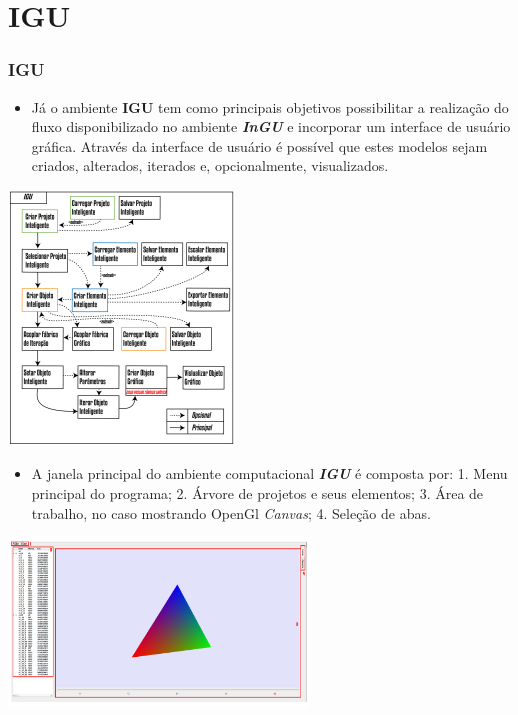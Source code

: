 \documentclass[10pt,aspectratio=169]{beamer}
\theoremstyle{remark}
\theoremstyle{definition}
\begin{document}
\section{IGU}
\begin{frame}[allowframebreaks]
\frametitle{IGU}
	\begin{itemize}
		\item Já o ambiente \textbf{IGU} tem como principais objetivos possibilitar a realização do fluxo disponibilizado no ambiente \textit{\textbf{InGU}} e incorporar um interface de usuário gráfica. Através da interface de usuário é possível que estes modelos sejam criados, alterados, iterados e, opcionalmente, visualizados.
	\end{itemize}		
	
	\begin{center}
	
		\item \includegraphics[width=0.45\textwidth]{Figures/CasoDeUso2@16x.png}
		
	\end{center}
	
	\framebreak
	
	\begin{itemize}
		\item A janela principal do ambiente computacional \textit{\textbf{IGU}} é composta por: 1. Menu principal do programa; 2. Árvore de projetos e seus elementos; 3. Área de trabalho, no caso mostrando OpenGl \textit{Canvas}; 4. Seleção de abas.
	\end{itemize}		
	
	\begin{center}
		
		\item \includegraphics[width=0.6\textwidth]{Figures/IGU_001a.png}
	

\end{center}
\end{frame}
\end{document}
